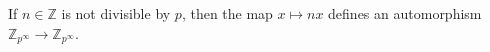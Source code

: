 If $n \in \mathbb{Z}$ is not divisible by $p$, then the map $x \mapsto nx$ defines an automorphism $\mathbb{Z}_{p^\infty} \rightarrow \mathbb{Z}_{p^\infty}$.
